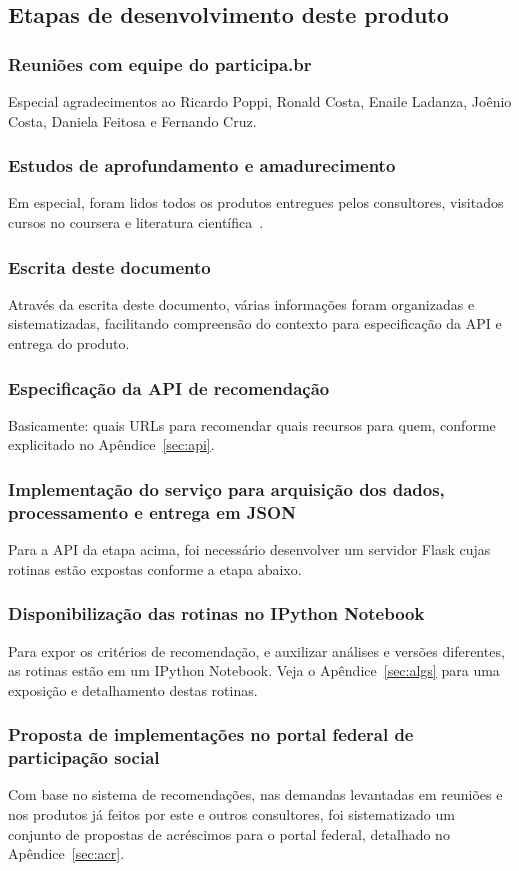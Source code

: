 \documentclass[12pt]{article}
\begin{document}
\subsection{Etapas de desenvolvimento deste produto}
\subsubsection{Reuniões com equipe do participa.br}
Especial agradecimentos ao Ricardo Poppi, Ronald Costa, Enaile Ladanza, Joênio Costa, Daniela Feitosa e Fernando Cruz.
\subsubsection{Estudos de aprofundamento e amadurecimento}
Em especial, foram lidos todos os produtos entregues pelos consultores, visitados cursos no coursera e literatura científica~\cite{pnudExtra}.
\subsubsection{Escrita deste documento}
Através da escrita deste documento, várias informações foram organizadas e sistematizadas, facilitando compreensão do contexto para especificação da API e entrega do produto.
\subsubsection{Especificação da API de recomendação}
Basicamente: quais URLs para recomendar quais recursos para quem, conforme explicitado no Apêndice~\ref{sec:api}.
\subsubsection{Implementação do serviço para arquisição dos dados, processamento e entrega em JSON}
Para a API da etapa acima, foi necessário desenvolver um servidor Flask cujas rotinas estão expostas conforme a etapa abaixo.
\subsubsection{Disponibilização das rotinas no IPython Notebook}
Para expor os critérios de recomendação, e auxilizar análises e versões diferentes, as rotinas estão em um IPython Notebook. Veja o Apêndice~\ref{sec:algs} para uma exposição e detalhamento destas rotinas.
\subsubsection{Proposta de implementações no portal federal de participação social}
Com base no sistema de recomendações, nas demandas levantadas em reuniões e nos produtos já feitos por este e outros consultores, foi sistematizado um conjunto de propostas de acréscimos para o portal federal, detalhado no Apêndice~\ref{sec:acr}.
\end{document}
